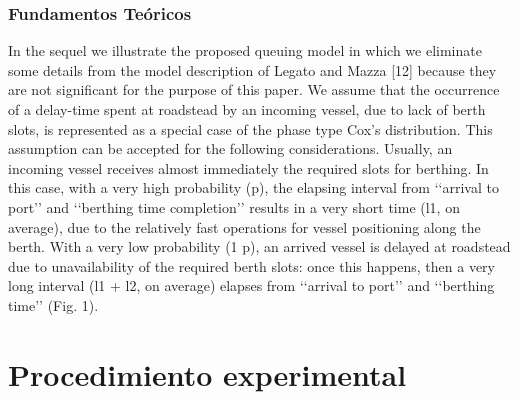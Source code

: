 \documentclass{beamer}
\begin{document}
\begin{frame}
\frametitle{Fundamentos Teóricos}

In the sequel we illustrate the proposed queuing model in which we eliminate some details from the model
description of Legato and Mazza [12] because they are not significant for the purpose of this paper.
We assume that the occurrence of a delay-time spent at roadstead by an incoming vessel, due to lack of
berth slots, is represented as a special case of the phase type Cox’s distribution. This assumption can be
accepted for the following considerations. Usually, an incoming vessel receives almost immediately the
required slots for berthing. In this case, with a very high probability (p), the elapsing interval from ‘‘arrival
to port’’ and ‘‘berthing time completion’’ results in a very short time (l1, on average), due to the relatively
fast operations for vessel positioning along the berth. With a very low probability (1  p), an arrived vessel
is delayed at roadstead due to unavailability of the required berth slots: once this happens, then a very long
interval (l1 + l2, on average) elapses from ‘‘arrival to port’’ and ‘‘berthing time’’ (Fig. 1).


\end{frame}

\section{Procedimiento experimental}
\end{document}
